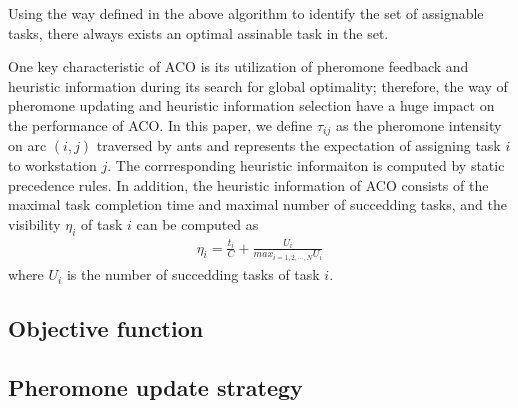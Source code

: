 Using the way defined in the above algorithm to identify the set of assignable tasks, there always exists an optimal assinable task in the set.

One key characteristic of ACO is its utilization of pheromone feedback and heuristic information during its search for global optimality; therefore, the way of pheromone updating and heuristic information selection have a huge impact on the performance of ACO.
In this paper, we define $\tau_{ij}$ as the pheromone intensity on arc $(i,j)$ traversed by ants and represents the expectation of assigning task $i$ to workstation $j$.
The corrresponding heuristic informaiton is computed by static precedence rules.
In addition, the heuristic information of ACO consists of the maximal task completion time and maximal number of succedding tasks, and the visibility $\eta_i$ of task $i$ can be computed as
\begin{align}
	\eta_i = \frac{t_i}{C} + \frac{U_i}{max_{i = 1, 2, \cdots, N}U_i}
\end{align}
where $U_i$ is the number of succedding tasks of task $i$.


\subsection{Objective function}






\subsection{Pheromone update strategy}




